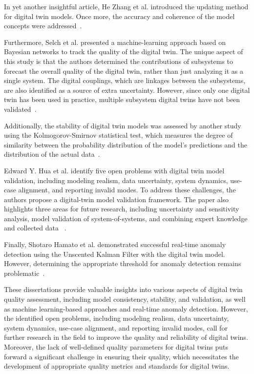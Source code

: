 \documentclass{llncs}
\begin{document}
    In yet another insightful article, He Zhang et al. introduced the updating method for digital twin models.
    Once more, the accuracy and coherence of the model concepts were addressed~\cite{ZHANGUPDATEMETHOD}.

    Furthermore, Selch et al. presented a machine-learning approach based on Bayesian networks to track the quality of the digital twin. 
    The unique aspect of this study is that the authors determined the contributions of subsystems to forecast the overall quality of the digital twin, 
    rather than just analyzing it as a single system. The digital couplings, which are linkages between the subsystems, are also identified as a source of extra uncertainty. 
    However, since only one digital twin has been used in practice, multiple subsystem digital twins have not been validated~\cite{QualityMonitoringofCoupledDigitalTwins}.

    Additionally, the stability of digital twin models was assessed by another study using the Kolmogorov-Smirnov statistical test, 
    which measures the degree of similarity between the probability distribution of the model's predictions and the distribution of the actual data~\cite{RadarDigitalTwin}.

    Edward Y. Hua et al. identify five open problems with digital twin model validation, including modeling realism, data uncertainty, system dynamics, use-case alignment, and reporting invalid modes.
    To address these challenges, the authors propose a digital-twin model validation framework. The paper also highlights three areas for future research, 
    including uncertainty and sensitivity analysis, model validation of system-of-systems, and combining expert knowledge and collected data ~\cite{ValidationofDigitalTwins}. 

    Finally, Shotaro Hamato et al. demonstrated successful real-time anomaly detection using the Unscented Kalman Filter with the digital twin model. 
    However, determining the appropriate threshold for anomaly detection remains problematic~\cite{JapeneseKalmanFilterCorrectness}.

    These dissertations provide valuable insights into various aspects of digital twin quality assessment, including model consistency, stability, and validation, as well as machine learning-based approaches and real-time anomaly detection. 
    However, the identified open problems, including modeling realism, data uncertainty, system dynamics, use-case alignment, and reporting invalid modes, call for further research in the field to improve the quality and reliability of digital twins. Moreover, 
    the lack of well-defined quality parameters for digital twins puts forward a significant challenge in ensuring their quality, which necessitates the development of appropriate quality metrics and standards for digital twins.
    
\end{document}
